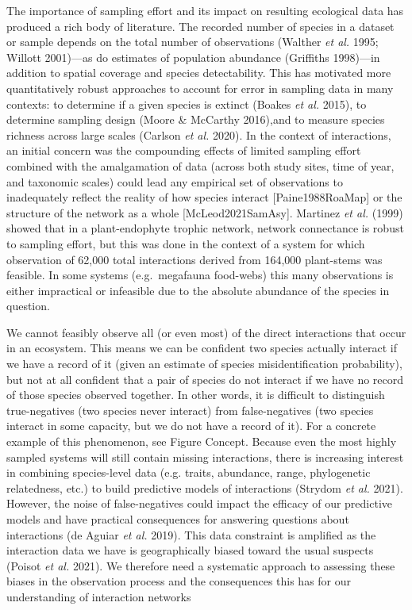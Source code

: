 \documentclass[10pt,oneside]{article}
\begin{document}
The importance of sampling effort and its impact on resulting ecological
data has produced a rich body of literature. The recorded number of
species in a dataset or sample depends on the total number of
observations (Walther \emph{et al.} 1995; Willott 2001)---as do
estimates of population abundance (Griffiths 1998)---in addition to
spatial coverage and species detectability. This has motivated more
quantitatively robust approaches to account for error in sampling data
in many contexts: to determine if a given species is extinct (Boakes
\emph{et al.} 2015), to determine sampling design (Moore \& McCarthy
2016),and to measure species richness across large scales (Carlson
\emph{et al.} 2020). In the context of interactions, an initial concern
was the compounding effects of limited sampling effort combined with the
amalgamation of data (across both study sites, time of year, and
taxonomic scales) could lead any empirical set of observations to
inadequately reflect the reality of how species interact
{[}Paine1988RoaMap{]} or the structure of the network as a whole
{[}McLeod2021SamAsy{]}. Martinez \emph{et al.} (1999) showed that in a
plant-endophyte trophic network, network connectance is robust to
sampling effort, but this was done in the context of a system for which
observation of 62,000 total interactions derived from 164,000
plant-stems was feasible. In some systems (e.g.~megafauna food-webs)
this many observations is either impractical or infeasible due to the
absolute abundance of the species in question.

We cannot feasibly observe all (or even most) of the direct interactions
that occur in an ecosystem. This means we can be confident two species
actually interact if we have a record of it (given an estimate of
species misidentification probability), but not at all confident that a
pair of species do not interact if we have no record of those species
observed together. In other words, it is difficult to distinguish
true-negatives (two species never interact) from false-negatives (two
species interact in some capacity, but we do not have a record of it).
For a concrete example of this phenomenon, see Figure Concept. Because
even the most highly sampled systems will still contain missing
interactions, there is increasing interest in combining species-level
data (e.g. traits, abundance, range, phylogenetic relatedness, etc.) to
build predictive models of interactions (Strydom \emph{et al.} 2021).
However, the noise of false-negatives could impact the efficacy of our
predictive models and have practical consequences for answering
questions about interactions (de Aguiar \emph{et al.} 2019). This data
constraint is amplified as the interaction data we have is
geographically biased toward the usual suspects (Poisot \emph{et al.}
2021). We therefore need a systematic approach to assessing these biases
in the observation process and the consequences this has for our
understanding of interaction networks
\end{document}
